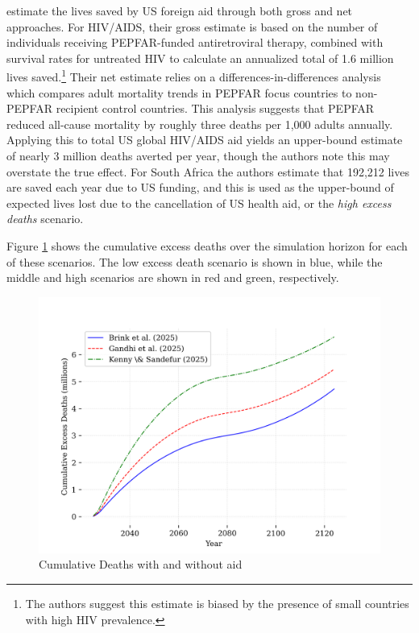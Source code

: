 \documentclass[letterpaper,12pt]{article}
\theoremstyle{definition}
\begin{document}
\begin{spacing}{1.5}
\citet{KS2025} estimate the lives saved by US foreign aid through both gross and net approaches. For HIV/AIDS, their gross estimate is based on the number of individuals receiving PEPFAR-funded antiretroviral therapy, combined with survival rates for untreated HIV to calculate an annualized total of 1.6 million lives saved.\footnote{The authors suggest this estimate is biased by the presence of small countries with high HIV prevalence.} Their net estimate relies on a differences-in-differences analysis which compares adult mortality trends in PEPFAR focus countries to non-PEPFAR recipient control countries. This analysis suggests that PEPFAR reduced all-cause mortality by roughly three deaths per 1,000 adults annually. Applying this to total US global HIV/AIDS aid yields an upper-bound estimate of nearly 3 million deaths averted per year, though the authors note this may overstate the true effect. For South Africa the authors estimate that 192,212 lives are saved each year due to US funding, and this is used as the upper-bound of expected lives lost due to the cancellation of US health aid, or the \textit{high excess deaths} scenario.

Figure \ref{fig:cumDeaths} shows the cumulative excess deaths over the simulation horizon for each of these scenarios. The low excess death scenario is shown in blue, while the middle and high scenarios are shown in red and green, respectively.

\begin{figure}[H]
    \caption{Cumulative Deaths with and without aid}
    \label{fig:cumDeaths}
    \centering
    \includegraphics[scale=0.75]{./tables_figures/cumulative_excess_deaths.png}
\end{figure}


\end{spacing}
\end{document}
